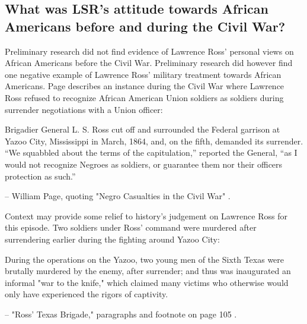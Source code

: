 \documentclass[12pt]{article}
\begin{document}
\subsection{What was LSR's attitude towards African Americans before and during the Civil War?}
Preliminary research did not find evidence of Lawrence Ross' personal views on African Americans before the Civil War. Preliminary research did however find one negative example of Lawrence Ross' military treatment towards African Americans. Page describes an instance during the Civil War where Lawrence Ross refused to recognize African American Union soldiers as soldiers during surrender negotiations with a Union officer:
\begin{displayquote}
Brigadier General L. S. Ross cut off and surrounded the Federal garrison at Yazoo City, Mississippi in March, 1864, and, on the fifth, demanded its surrender.  “We squabbled about the terms of the capitulation,” reported the General, “as I would not recognize Negroes as soldiers, or guarantee them nor their officers protection as such.”

-- William Page, quoting "Negro Casualties in the Civil War" \cite[pg. 62]{page}.
\end{displayquote}

Context may provide some relief to history's judgement on Lawrence Ross for this episode. Two soldiers under Ross' command were murdered after surrendering earlier during the fighting around Yazoo City:
\begin{displayquote}
During the operations on the Yazoo, two young men of the Sixth Texas were brutally murdered by the enemy, after surrender; and thus was inaugurated an informal "war to the knife," which claimed many victims who otherwise would only have experienced the rigors of captivity. 

-- "Ross' Texas Brigade," paragraphs and footnote on page 105 \cite[pg. 105]{texasbrigade}.
\end{displayquote}
\end{document}
